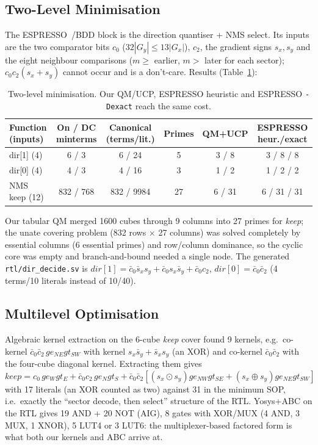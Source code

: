 \documentclass[11pt,a4paper]{article}
\begin{document}
\subsection{Two-Level Minimisation}
The ESPRESSO~\cite{espresso}/BDD block is the direction quantiser + NMS select. Its inputs are the two comparator bits $c_0$
($32|G_y|\le13|G_x|$), $c_2$, the gradient signs $s_x,s_y$ and the eight neighbour comparisons ($m\ge$ earlier, $m>$ later
for each sector); $c_0c_2(s_x+s_y)$ cannot occur and is a don't-care. Results (Table~\ref{tab:twolevel}):
\begin{table}[H]\centering\footnotesize
\caption{Two-level minimisation. Our QM/UCP, ESPRESSO heuristic and ESPRESSO \texttt{-Dexact} reach the same cost.}\label{tab:twolevel}
\setlength{\tabcolsep}{3pt}\begin{tabular}{@{}lccccc@{}}
\toprule
Function (inputs) & On / DC minterms & Canonical (terms/lit.) & Primes & QM+UCP & ESPRESSO heur./exact\\
\midrule
dir[1] (4) & 6 / 3 & 6 / 24 & 5 & 3 / 8 & 3 / 8 \;\; 3 / 8\\
dir[0] (4) & 4 / 3 & 4 / 16 & 3 & 1 / 2 & 1 / 2 \;\; 1 / 2\\
NMS keep (12) & 832 / 768 & 832 / 9984 & 27 & 6 / 31 & 6 / 31 \;\; 6 / 31\\
\bottomrule
\end{tabular}
\end{table}
Our tabular QM merged 1600 cubes through 9 columns into 27 primes for \emph{keep}; the unate covering problem (832 rows $\times$ 27
columns) was solved completely by essential columns (6 essential primes) and row/column dominance, so the cyclic core was empty and
branch-and-bound needed a single node. The generated \texttt{rtl/dir\_decide.sv} is
$\mathit{dir}[1]=\bar c_0\bar s_x s_y+\bar c_0 s_x\bar s_y+\bar c_0c_2$, $\mathit{dir}[0]=\bar c_0\bar c_2$ (4 terms/10 literals instead of 10/40).

\subsection{Multilevel Optimisation}
Algebraic kernel extraction on the 6-cube \emph{keep} cover found 9 kernels, e.g.\ co-kernel $\bar c_0\bar c_2\,ge_{NE}gt_{SW}$ with
kernel $s_x\bar s_y+\bar s_xs_y$ (an XOR) and co-kernel $\bar c_0\bar c_2$ with the four-cube diagonal kernel. Extracting them gives
$\mathit{keep}=c_0\,ge_Wgt_E+\bar c_0c_2\,ge_Ngt_S+\bar c_0\bar c_2[(s_x\odot s_y)ge_{NW}gt_{SE}+(s_x\oplus s_y)ge_{NE}gt_{SW}]$ with
17 literals (an XOR counted as two) against 31 in the minimum SOP, i.e.\ exactly the ``sector decode, then select'' structure of the RTL.
Yosys+ABC on the RTL gives 19 AND + 20 NOT (AIG), 8 gates with XOR/MUX (4 AND, 3 MUX, 1 XNOR), 5 LUT4 or 3 LUT6:
the multiplexer-based factored form is what both our kernels and ABC arrive at.
\end{document}
